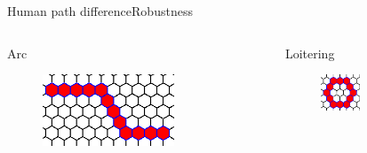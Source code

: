 \begin{frame}{Human path difference}{Robustness}
\bigskip

\begin{columns}[T]
\begin{block}{Arc}
\begin{minipage}[c][.2\textheight][c]{\linewidth}
\begin{figure}
\centering
\includegraphics[width = 0.7\textwidth]{./figure/HMP_Arc_Small.png}
\end{figure}
\end{minipage}
\end{block}

\begin{block}{Loitering}
\begin{minipage}[c][.2\textheight][c]{\linewidth}
\begin{figure}
\centering
\includegraphics[width = 0.4\textwidth]{./figure/HMP_Loitering_Small.png}
\end{figure}
\end{minipage}
\end{block}
\end{columns}

\end{frame}

